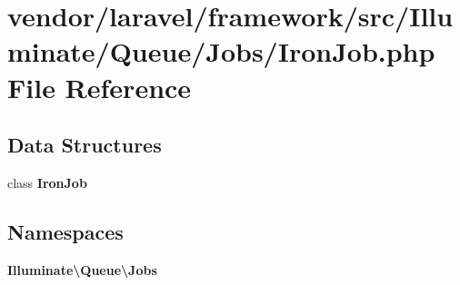 \section{vendor/laravel/framework/src/\+Illuminate/\+Queue/\+Jobs/\+Iron\+Job.php File Reference}
\label{_iron_job_8php}
\subsection*{Data Structures}
\begin{DoxyCompactItemize}
\item 
class {\bf Iron\+Job}
\end{DoxyCompactItemize}
\subsection*{Namespaces}
\begin{DoxyCompactItemize}
\item 
 {\bf Illuminate\textbackslash{}\+Queue\textbackslash{}\+Jobs}
\end{DoxyCompactItemize}
